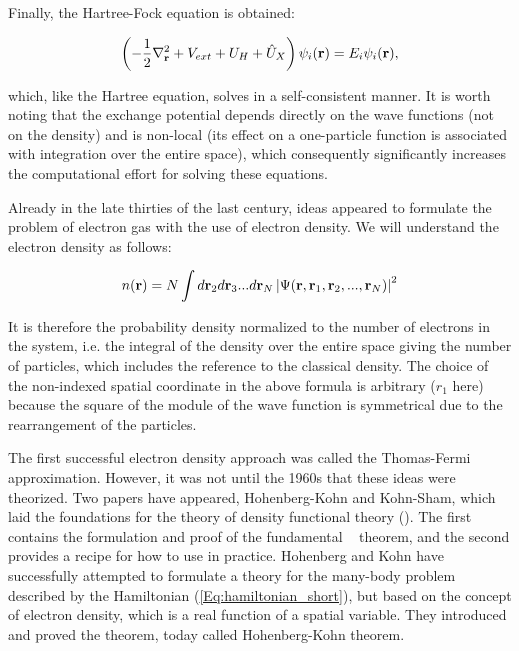 Finally, the Hartree-Fock equation is obtained:

\begin{equation}
    \label{Eq:hartree-fock_equations}
    \left(-\frac{1}{2}\nabla^2_{\mathbf{r}}+V_{ext}+U_H+\hat{U}_{X}\right)\psi_i(\mathbf{r})=E_i\psi_i(\mathbf{r}),
\end{equation}

which, like the Hartree equation, solves in a self-consistent manner.
It is worth noting that the exchange potential depends directly on the wave functions (not on the density) and is non-local (its effect on a one-particle function is associated with integration over the entire space), which consequently significantly increases the computational effort for solving these equations.

Already in the late thirties of the last century, ideas appeared to formulate the problem of electron gas with the use of electron density.
We will understand the electron density as follows:

\begin{equation}
    \label{Eq:density}
    n(\mathbf{r})=N\int d\mathbf{r}_2d\mathbf{r}_3...d\mathbf{r}_N\left| \Psi(\mathbf{r},\mathbf{r}_1,\mathbf{r}_2,...,\mathbf{r}_N)\right|^2
\end{equation}

It is therefore the probability density normalized to the number of electrons in the system, i.e. the integral of the density over the entire space giving the number of particles, which includes the reference to the classical density.
The choice of the non-indexed spatial coordinate in the above formula is arbitrary ($r_1$ here) because the square of the module of the wave function is symmetrical due to the rearrangement of the particles.

The first successful electron density approach was called the Thomas-Fermi approximation.
However, it was not until the 1960s that these ideas were theorized.
Two papers have appeared, Hohenberg-Kohn and Kohn-Sham, which laid the foundations for the theory of density functional theory (\DFT).
The first contains the formulation and proof of the fundamental \DFT\ \cite{hohenberg} theorem, and the second provides a recipe for how to use \cite{kohn_sham_eq} in practice.
Hohenberg and Kohn have successfully attempted to formulate a theory for the many-body problem described by the Hamiltonian (\ref{Eq:hamiltonian_short}), but based on the concept of electron density, which is a real function of a spatial variable.
They introduced and proved the theorem, today called Hohenberg-Kohn \cite{hohenberg} theorem.

